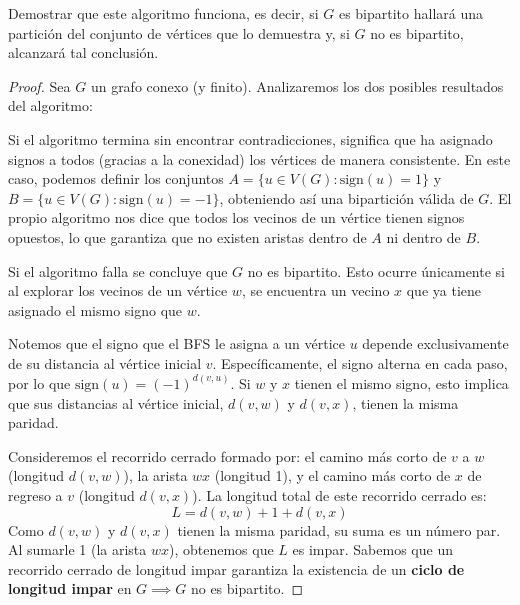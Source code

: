 Demostrar que este algoritmo funciona, es decir, si \( G \) es bipartito hallará una partición del conjunto de vértices que lo demuestra y, si \( G \) no es bipartito, alcanzará tal conclusión.
\begin{proof}
    Sea \(G\) un grafo conexo (y finito). Analizaremos los dos posibles resultados del algoritmo:

    Si el algoritmo termina sin encontrar contradicciones, significa que ha asignado signos a todos (gracias a la conexidad) los vértices de manera consistente. En este caso, podemos definir los conjuntos \( A = \{ u \in V(G) : \text{sign}(u) = 1 \} \) y \( B = \{ u \in V(G) : \text{sign}(u) = -1 \} \), obteniendo así una bipartición válida de \(G\). El propio algoritmo nos dice que todos los vecinos de un vértice tienen signos opuestos, lo que garantiza que no existen aristas dentro de \(A\) ni dentro de \(B\).

    Si el algoritmo falla se concluye que \(G\) no es bipartito. Esto ocurre únicamente si al explorar los vecinos de un vértice \(w\), se encuentra un vecino \(x\) que ya tiene asignado el mismo signo que \(w\).

    Notemos que el signo que el BFS le asigna a un vértice \(u\) depende exclusivamente de su distancia al vértice inicial \(v\). Específicamente, el signo alterna en cada paso, por lo que \(\text{sign}(u) = {(-1)}^{d(v, u)}\).
    Si \(w\) y \(x\) tienen el mismo signo, esto implica que sus distancias al vértice inicial, \(d(v, w)\) y \(d(v, x)\), tienen la misma paridad.

    Consideremos el recorrido cerrado formado por: el camino más corto de \(v\) a \(w\) (longitud \(d(v,w)\)), la arista \(wx\) (longitud 1), y el camino más corto de \(x\) de regreso a \(v\) (longitud \(d(v,x)\)). La longitud total de este recorrido cerrado es:
    \[
        L = d(v, w) + 1 + d(v, x)
    \]
    Como \(d(v, w)\) y \(d(v, x)\) tienen la misma paridad, su suma es un número par. Al sumarle 1 (la arista \(wx\)), obtenemos que \(L\) es impar. Sabemos que un recorrido cerrado de longitud impar garantiza la existencia de un \textbf{ciclo de longitud impar} en \(G \implies G \) no es bipartito.
\end{proof}